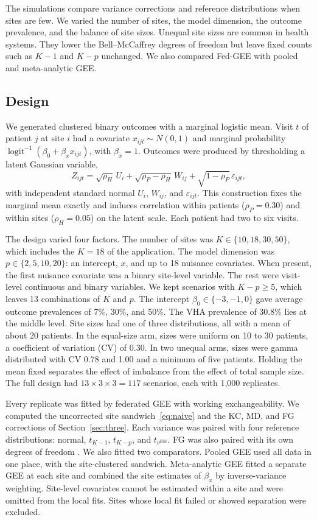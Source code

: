 \documentclass[12pt]{article}
\theoremstyle{remark}
\begin{document}
The simulations compare variance corrections and reference distributions when
sites are few. We varied the number of sites, the model dimension, the outcome
prevalence, and the balance of site sizes. Unequal site sizes are common in
health systems. They lower the Bell--McCaffrey degrees of freedom but leave
fixed counts such as $K-1$ and $K-p$ unchanged. We also compared Fed-GEE with
pooled and meta-analytic GEE.

\subsection{Design}
\label{sec:simdesign}

We generated clustered binary outcomes with a marginal logistic mean. Visit $t$
of patient $j$ at site $i$ had a covariate $x_{ijt}\sim N(0,1)$ and marginal
probability $\operatorname{logit}^{-1}(\beta_0+\beta_xx_{ijt})$, with
$\beta_x=1$. Outcomes were produced by thresholding a latent Gaussian variable,
\[
Z_{ijt}=\sqrt{\rho_H}\,U_i+\sqrt{\rho_P-\rho_H}\,W_{ij}
+\sqrt{1-\rho_P}\,\varepsilon_{ijt},
\]
with independent standard normal $U_i$, $W_{ij}$, and $\varepsilon_{ijt}$. This
construction fixes the marginal mean exactly and induces correlation within
patients ($\rho_P=0.30$) and within sites ($\rho_H=0.05$) on the latent scale.
Each patient had two to six visits.

The design varied four factors. The number of sites was
$K\in\{10,18,30,50\}$, which includes the $K=18$ of the application. The model
dimension was $p\in\{2,5,10,20\}$: an intercept, $x$, and up to 18 nuisance
covariates. When present, the first nuisance covariate was
a binary site-level variable. The rest were visit-level continuous and binary
variables. We kept scenarios with $K-p\ge5$, which leaves 13 combinations of $K$
and $p$. The intercept $\beta_0\in\{-3,-1,0\}$ gave average outcome prevalences
of 7\%, 30\%, and 50\%. The VHA prevalence of 30.8\% lies at the middle level.
Site sizes had one of three distributions, all with a mean of about 20 patients.
In the equal-size arm, sizes were uniform on 10 to 30 patients, a coefficient of
variation (CV) of 0.30. In two unequal arms, sizes were gamma distributed with
CV 0.78 and 1.00 and a minimum of five patients. Holding the mean fixed separates
the effect of imbalance from the effect of total sample size. The full design had
$13\times3\times3=117$ scenarios, each with 1{,}000 replicates. 

Every replicate was fitted by federated GEE with working exchangeability. We
computed the uncorrected site sandwich~\eqref{eq:naive} and the KC, MD, and FG
corrections of Section~\ref{sec:three}. Each variance was paired with four
reference distributions: normal, $t_{K-1}$, $t_{K-p}$, and
$t_{\nu^{\mathrm{BM}}}$. FG was also paired with its own degrees of freedom
\citep{fay2001small}. We also fitted two comparators. Pooled GEE used all data in
one place, with the site-clustered sandwich. Meta-analytic GEE fitted a separate
GEE at each site and combined the site estimates of $\beta_x$ by
inverse-variance weighting. Site-level covariates cannot be estimated within a
site and were omitted from the local fits. Sites whose local fit failed or
showed separation were excluded.
\end{document}
